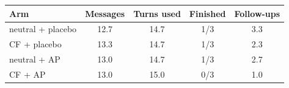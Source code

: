 \begin{tabular}{lcccc}
\toprule
Arm & Messages & Turns used & Finished & Follow-ups \\
\midrule
neutral + placebo & 12.7 & 14.7 & 1/3 & 3.3 \\
CF + placebo & 13.3 & 14.7 & 1/3 & 2.3 \\
neutral + AP & 13.0 & 14.7 & 1/3 & 2.7 \\
CF + AP & 13.0 & 15.0 & 0/3 & 1.0 \\
\bottomrule
\end{tabular}
